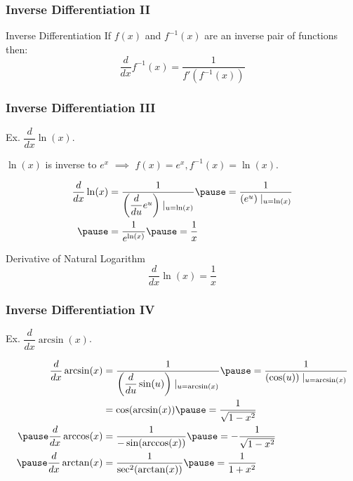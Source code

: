 \documentclass{ltx-talk}
\begin{document}
 \begin{frame}
   \frametitle{Inverse Differentiation II}

   \begin{alertblock}{Inverse Differentiation}
     If $f(x)$ and $f^{-1}(x)$ are an inverse pair of functions
     then: \pause
     \begin{equation}
       \dfrac{d}{dx} f^{-1}(x) = \dfrac{1}{f'(f^{-1}(x))}
     \end{equation}
   \end{alertblock} \pause
 \end{frame}
 \begin{frame}
   \frametitle{Inverse Differentiation III}

   Ex. $\dfrac{d}{dx}\ln(x)$. \pause

   $\ln(x)$ is inverse to $e^x$ $\implies$ $f(x) = e^x, f^{-1}(x) = \ln(x)$. \pause

   \begin{align}
     \dfrac{d}{dx} \ln(x) &= \dfrac{1}{\left(\dfrac{d}{du} e^u\right)\mid_{u = \ln(x)}} \pause = \dfrac{1}{\left(e^u\right) \mid_{u = \ln(x)}} \\ \pause
                          &= \dfrac{1}{e^{\ln(x)}} \pause = \dfrac{1}{x}
   \end{align} \pause

   \begin{alertblock}{Derivative of Natural Logarithm}
     \begin{equation}
       \dfrac{d}{dx} \ln(x) = \dfrac{1}{x}
     \end{equation}
   \end{alertblock}
 \end{frame}
 
 \begin{frame}
   \frametitle{Inverse Differentiation IV}
   Ex. $\dfrac{d}{dx} \arcsin(x)$. \pause

   \begin{align}
     \dfrac{d}{dx} \arcsin(x) &= \dfrac{1}{\left(\dfrac{d}{du}\sin(u)\right)\mid_{u = \arcsin(x)}} \pause = \dfrac{1}{(\cos(u))\mid_{u = \arcsin(x)}} \\
                              &= \cos(\arcsin(x)) \pause = \dfrac{1}{\sqrt{1 - x^2}} \\ \pause
     \dfrac{d}{dx} \arccos(x) &= \dfrac{1}{-\sin(\arccos(x))} \pause = -\dfrac{1}{\sqrt{1 - x^2}} \\ \pause
     \dfrac{d}{dx} \arctan(x) &= \dfrac{1}{\sec^2(\arctan(x))} \pause = \dfrac{1}{1 + x^2}
   \end{align} 
 \end{frame}
\end{document}
